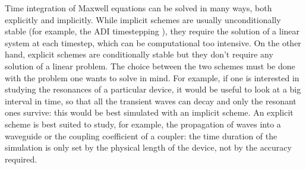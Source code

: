 Time integration of Maxwell equations can be solved in many ways, both
explicitly and implicitly. While implicit schemes are usually
unconditionally stable (for example, the ADI timestepping
\cite{taflove_computational}), they require the solution of a linear
system at each timestep, which can be computational too intensive. On
the other hand, explicit schemes are conditionally stable but they
don't require any solution of a linear problem. The choice between the
two schemes must be done with the problem one wants to solve in
mind. For example, if one is interested in studying the resonances of
a particular device, it would be useful to look at a big interval in
time, so that all the transient waves can decay and only the resonant
ones survive: this would be best simulated with an implicit scheme. An
explicit scheme is best suited to study, for example, the propagation
of waves into a waveguide or the coupling coefficient of a coupler:
the time duration of the simulation is only set by the physical length
of the device, not by the accuracy required.

